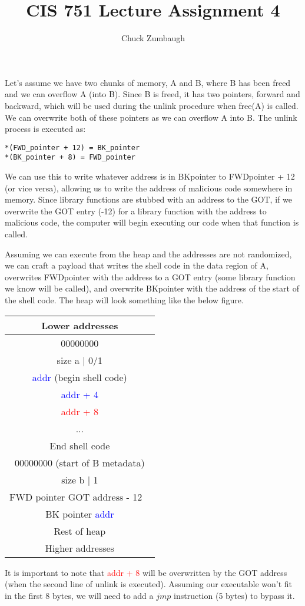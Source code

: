 \documentclass[12pt]{article}
\title{CIS 751 Lecture Assignment 4}
\author{Chuck Zumbaugh}
\begin{document}
\maketitle

Let's assume we have two chunks of memory, A and B, where B has been freed and we can overflow A (into B). Since B is freed,  it has two pointers, forward and backward, which will be used during the unlink procedure when free(A) is called. We can  overwrite both of these pointers as we can overflow A into B. The unlink process is executed as:
\begin{lstlisting}
*(FWD_pointer + 12) = BK_pointer
*(BK_pointer + 8) = FWD_pointer
\end{lstlisting}

We can use this to write whatever address is in BKpointer to FWDpointer + 12 (or vice versa), allowing us to write the address of malicious code somewhere in memory. Since library functions are stubbed with an address to the GOT, if we overwrite the GOT entry (-12) for a library function with the address to malicious code, the computer will begin executing our code when that function is called. 

Assuming we can execute from the heap and the addresses are not randomized, we can craft a payload that writes the shell code in the data region of A, overwrites FWDpointer with the address to a GOT entry (some library function we know will be called), and overwrite BKpointer with the address of the start of the shell code. The heap will look something like the below figure.

\begin{tabular}{|c|}
\hline
Lower addresses \\
\hline
00000000 \\
\hline
size a | 0/1 \\
\hline
\textcolor{blue}{addr} (begin shell code) \\
\hline
\textcolor{blue}{addr + 4} \\
\hline
\textcolor{red}{addr + 8} \\
\hline
... \\
\hline
End shell code \\
\hline
00000000 (start of B metadata) \\
\hline 
size b | 1 \\
\hline
FWD pointer \textcolor{royalpurple}{GOT address - 12} \ \\
\hline
BK pointer \textcolor{blue}{addr} \\
\hline
Rest of heap \\
\hline
Higher addresses \\
\hline
\end{tabular}
\bigbreak
It is important to note that \textcolor{red}{addr + 8} will be overwritten by the GOT address (when the second line of unlink is executed). Assuming our executable won't fit in the first 8 bytes, we will need to add a $jmp$ instruction (5 bytes) to bypass it.
\end{document}
